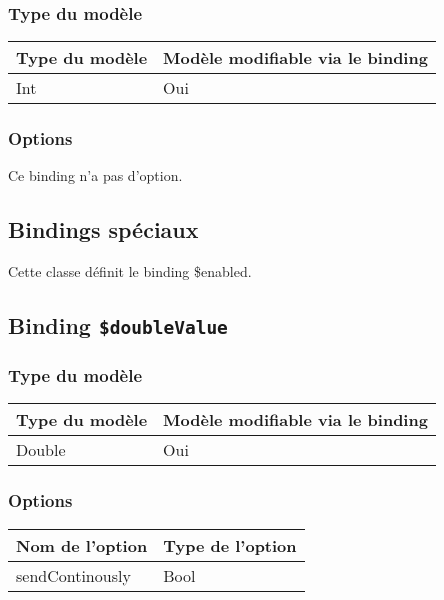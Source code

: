 \subsubsection{Type du modèle}

\begin{tabular}{|l|l|}
\hline
\textbf{Type du modèle} & \textbf{Modèle modifiable via le binding}\\
\hline
Int & Oui\\
\hline
\end{tabular}
\subsubsection{Options}

Ce binding n'a pas d'option.









\subsection{Bindings spéciaux}

Cette classe définit le binding \$enabled.

\subsection{Binding \texttt{\$doubleValue}}

\subsubsection{Type du modèle}

\begin{tabular}{|l|l|}
\hline
\textbf{Type du modèle} & \textbf{Modèle modifiable via le binding}\\
\hline
Double & Oui\\
\hline
\end{tabular}
\subsubsection{Options}

\begin{tabular}{|l|l|}
\hline
\textbf{Nom de l'option} & \textbf{Type de l'option}\\
\hline
sendContinously & Bool\\
\hline
\end{tabular}
